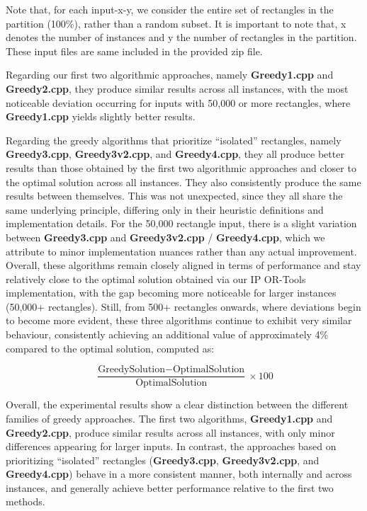 \documentclass{report}
\begin{document}
\noindent Note that, for each input-x-y, we consider the entire set of rectangles in the partition (100\%), rather than a random subset. It is important to note that, x denotes the number of instances and y the number of rectangles in the partition. These input files are same included in the provided zip file.

\noindent Regarding our first two algorithmic approaches, namely \textbf{Greedy1.cpp} and \textbf{Greedy2.cpp}, they produce similar results across all instances, with the most noticeable deviation occurring for inputs with 50,000 or more rectangles, where \textbf{Greedy1.cpp} yields slightly better results.

\noindent Regarding the greedy algorithms that prioritize “isolated” rectangles, namely \textbf{Greedy3.cpp}, \textbf{Greedy3v2.cpp}, and \textbf{Greedy4.cpp}, they all produce better results than those obtained by the first two algorithmic approaches and closer to the optimal solution across all instances. They also consistently produce the same results between themselves. This was not unexpected, since they all share the same underlying principle, differing only in their heuristic definitions and implementation details. For the 50,000 rectangle input, there is a slight variation between \textbf{Greedy3.cpp} and \textbf{Greedy3v2.cpp} / \textbf{Greedy4.cpp}, which we attribute to minor implementation nuances rather than any actual improvement. Overall, these algorithms remain closely aligned in terms of performance and stay relatively close to the optimal solution obtained via our IP OR-Tools implementation, with the gap becoming more noticeable for larger instances (50,000+ rectangles). Still, from 500+ rectangles onwards, where deviations begin to become more evident, these three algorithms continue to exhibit very similar behaviour, consistently achieving an additional value of approximately 4\% compared to the optimal solution, computed as:

\[
\frac{\text{GreedySolution} - \text{OptimalSolution}}{\text{OptimalSolution}} \times 100
\]

\noindent Overall, the experimental results show a clear distinction between the different families of greedy approaches. The first two algorithms, \textbf{Greedy1.cpp} and \textbf{Greedy2.cpp}, produce similar results across all instances, with only minor differences appearing for larger inputs. In contrast, the approaches based on prioritizing “isolated” rectangles (\textbf{Greedy3.cpp}, \textbf{Greedy3v2.cpp}, and \textbf{Greedy4.c\allowbreak pp}) behave in a more consistent manner, both internally and across instances, and generally achieve better performance relative to the first two methods.
\end{document}
